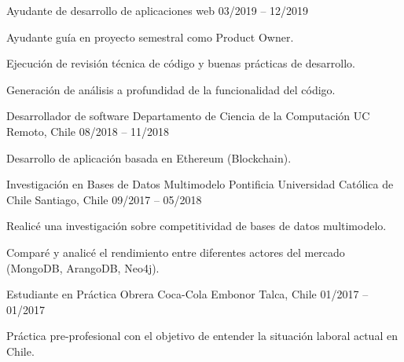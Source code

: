 \begin{cventries}
  \cventry
    {Ayudante de desarrollo de aplicaciones web} %
    {} %
    {} %
    {03/2019 – 12/2019} %
    {
      \begin{cvitems} %
        \item {Ayudante guía en proyecto semestral como Product Owner.}
        \item {Ejecución de revisión técnica de código y buenas prácticas de desarrollo.}
        \item {Generación de análisis a profundidad de la funcionalidad del código.}
      \end{cvitems}
    }

  \cventry
    {Desarrollador de software} %
    {Departamento de Ciencia de la Computación UC} %
    {Remoto, Chile} %
    {08/2018 – 11/2018} %
    {
      \begin{cvitems} %
        \item {Desarrollo de aplicación basada en Ethereum (Blockchain).}
      \end{cvitems}
    }

  \cventry
    {Investigación en Bases de Datos Multimodelo} %
    {Pontificia Universidad Católica de Chile} %
    {Santiago, Chile} %
    {09/2017 – 05/2018} %
    {
      \begin{cvitems} %
        \item {Realicé una investigación sobre competitividad de bases de datos multimodelo.}
        \item {Comparé y analicé el rendimiento entre diferentes actores del mercado (MongoDB, ArangoDB, Neo4j).}
      \end{cvitems} 
    }

  \cventry
    {Estudiante en Práctica Obrera} %
    {Coca-Cola Embonor } %
    {Talca, Chile} %
    {01/2017 – 01/2017 } %
    {
      \begin{cvitems} %
        \item {Práctica pre-profesional con el objetivo de entender la situación laboral actual en Chile.}
      \end{cvitems}
    }

\end{cventries}
